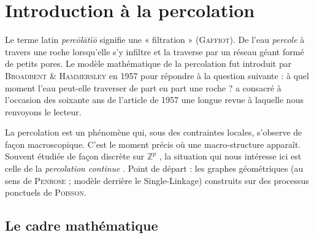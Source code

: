 


\section{Introduction à la percolation}

Le terme latin \emph{percōlātĭō} signifie une « filtration » (\textsc{Gaffiot}). De l'eau \emph{percole} à travers une roche lorsqu'elle s'y infiltre et la traverse par un réseau géant formé de petits pores. Le modèle mathématique de la percolation fut introduit par \textsc{Broadbent \& Hammersley} \cite{BroadbentHammersley1957} en 1957 pour répondre à la question suivante : à quel moment l'eau peut-elle traverser de part en part une roche ?  \cite{SoixanteAnsPercolation} a consacré à l'occasion des soixante ans de l'article de 1957 une longue revue à laquelle nous renvoyons le lecteur.

La percolation est un phénomène qui, sous des contraintes locales, s'observe de façon macroscopique. C'est le moment précis où une macro-structure apparaît. Souvent étudiée de façon discrète sur $\mathbb Z^p$ \cite{Grimmett1999, Percolation2006}, la situation qui nous intéresse ici est celle de la \emph{percolation continue} \cite{MeesterRoy, penrose2003}. Point de départ : les graphes géométriques (au sens de \textsc{Penrose} \cite{Penrose1995, penrose2003} ; modèle derrière le Single-Linkage) construits sur des processus ponctuels de \textsc{Poisson}.

\subsection{Le cadre mathématique}

